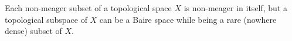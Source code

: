 Each non-meager subset of a topological space $X$ is non-meager in itself, but a topological subspace of $X$ can be a Baire space while being a rare (nowhere dense) subset of $X$.
